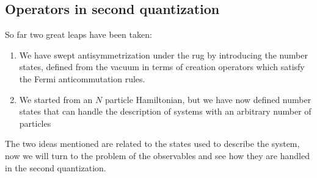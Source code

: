 \subsection{Operators in second quantization}

So far two great leaps have been taken: 
\begin{enumerate}
 \item We have swept antisymmetrization under the rug by introducing the number
states, defined from the vacuum in terms of creation operators which satisfy
the Fermi anticommutation rules. 
 
 \item We started from an $N$ particle Hamiltonian, but we have now defined
number states that can handle the description of systems with an arbitrary
number of particles 
\end{enumerate}
The two ideas mentioned are related to the states used to describe the system,
now we will turn to the problem of the observables and see how they are handled
in the second quantization.  


